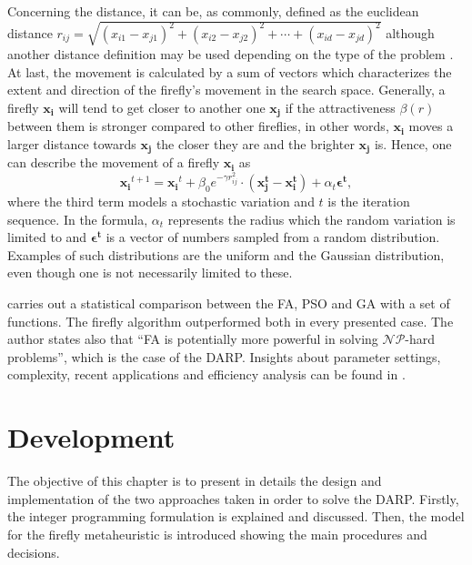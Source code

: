 \documentclass[tuberlin,cic,tc,openright,english,noabntcite,oneside]{iiufrgs}
\begin{document}
Concerning the distance, it can be, as commonly, defined as the euclidean distance $r_{ij} = \sqrt{(x_{i1} - x_{j1})^{2}+(x_{i2} - x_{j2})^{2}+\cdots+(x_{id} - x_{jd})^{2}}$ although another distance definition may be used depending on the type of the problem \parencite[p. 193]{yang_efficiency_2012}. At last, the movement is calculated by a sum of vectors which characterizes the extent and direction of the firefly's movement in the search space. Generally, a firefly $\mathbf{x_i}$ will tend to get closer to another one $\mathbf{x_j}$ if the attractiveness $\beta(r)$ between them is stronger compared to other fireflies, in other words, $\mathbf{x_i}$ moves a larger distance towards $\mathbf{x_j}$ the closer they are and the brighter $\mathbf{x_j}$ is. Hence, one can describe the movement of a firefly $\mathbf{x_i}$ as
$$\mathbf{x_i}^{t+1} = \mathbf{x_i}^{t} + \beta_{0}e^{-\gamma r_{ij}^{2}} \cdot (\mathbf{x^{t}_j} - \mathbf{x^{t}_i}) + \alpha_{t} \mathbf{\epsilon^{t}},$$
where the third term models a stochastic variation and $t$ is the iteration sequence. In the formula, $\alpha_t$ represents the radius which the random variation is limited to and $\mathbf{\epsilon^{t}}$ is a vector of numbers sampled from a random distribution. Examples of such distributions are the uniform and the Gaussian distribution, even though one is not necessarily limited to these.

\textcite[p. 177]{yang_firefly_2009} carries out a statistical comparison between the FA, PSO and GA with a set of functions. The firefly algorithm outperformed both in every presented case. The author states also that \enquote{FA is potentially more powerful in solving $\mathcal{NP}$-hard problems}, which is the case of the DARP. Insights about parameter settings, complexity, recent applications and efficiency analysis can be found in \textcite{yang_firefly_2013}.

\chapter{Development}
The objective of this chapter is to present in details the design and implementation of the two approaches taken in order to solve the DARP. Firstly, the integer programming formulation is explained and discussed. Then, the model for the firefly metaheuristic is introduced showing the main procedures and decisions.
\end{document}

